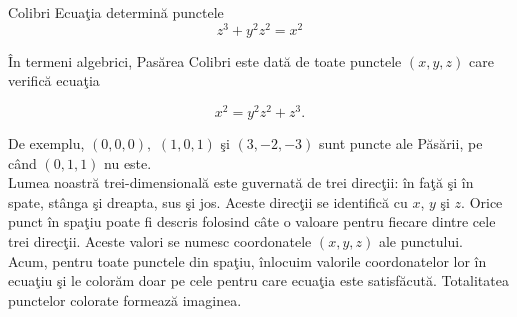 \begin{surferPage}{Colibri}
Ecua\c tia determin\u a punctele\\
  
  \smallskip
\[z^3+ y^2	z^2	= x^2\]

\singlespacing
\^In termeni algebrici, Pas\u area Colibri este dat\u a de toate punctele $(x, y, z)$ care verific\u a ecua\c tia 
\smallskip

\[ x^2= y^2z^2+z^3.\]
\smallskip

De exemplu, $(0,0,0),$ $(1,0,1)$ \c si $(3,-2,-3)$ sunt puncte ale P\u as\u arii, pe c\^and $(0,1,1)$ nu este.\\
\singlespacing
Lumea noastr\u a trei-dimensional\u a este guvernat\u a de trei direc\c tii: \^in fa\c t\u a \c si \^in spate, 
st\^anga \c si dreapta, sus \c si jos. Aceste direc\c tii se identific\u a cu $x$, $y$ \c si $z$. 
Orice punct \^in spa\c tiu poate fi descris folosind c\^ate o valoare pentru fiecare dintre cele trei direc\c tii. 
Aceste valori se numesc coordonatele $(x,y,z)$ ale punctului.\\
\singlespacing
Acum, pentru toate punctele din spa\c tiu, \^inlocuim valorile coordonatelor lor \^in ecua\c tiu \c si 
le color\u am doar pe cele pentru care ecua\c tia este satisf\u acut\u a. Totalitatea punctelor colorate formeaz\u a 
imaginea.

\end{surferPage}

